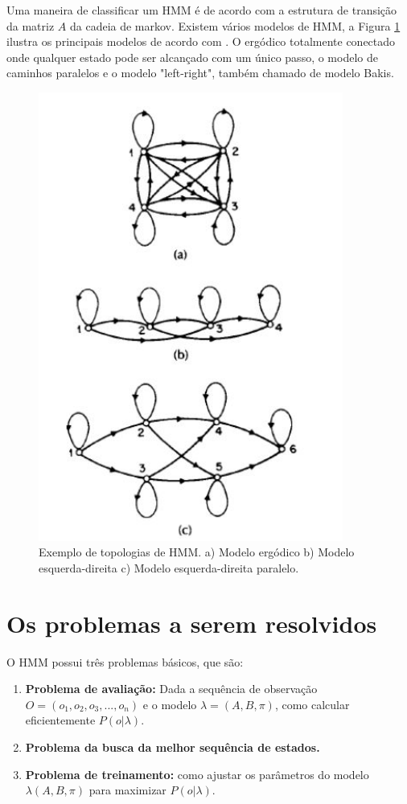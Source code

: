 \quad Uma maneira de classificar um HMM é de acordo com a estrutura de transição da matriz $A$ da cadeia de markov. Existem vários modelos de HMM, a Figura \ref{fig:topohmm} ilustra os  principais modelos de acordo com \cite{fundRecFala}. O ergódico totalmente conectado onde qualquer estado pode ser alcançado com um único passo, o modelo de caminhos paralelos e o modelo "left-right", também chamado de modelo Bakis.%
\begin{figure}[H]
\centering %
\includegraphics[width=10cm]{img/topohmm.jpg} %
\caption{Exemplo de topologias de HMM. a) Modelo ergódico b) Modelo esquerda-direita c) Modelo esquerda-direita paralelo. \textit{\cite{fundRecFala}}}
\label{fig:topohmm}
\end{figure}

\section{Os problemas a serem resolvidos}
\label{sec:3prob}
\quad O HMM possui três problemas básicos, que são:
\begin{enumerate}
\item \textbf{Problema de avaliação:} Dada a sequência de observação $O = (o_1, o_2, o_3, ..., o_n)$ e o modelo $\lambda = (A, B, \pi)$, como calcular eficientemente $P(o| \lambda)$.
\item \textbf{Problema da busca da melhor sequência de estados.}
\item \textbf{Problema de treinamento:} como ajustar os parâmetros do modelo $\lambda(A, B, \pi)$ para maximizar $P(o|\lambda)$.
\end{enumerate}

